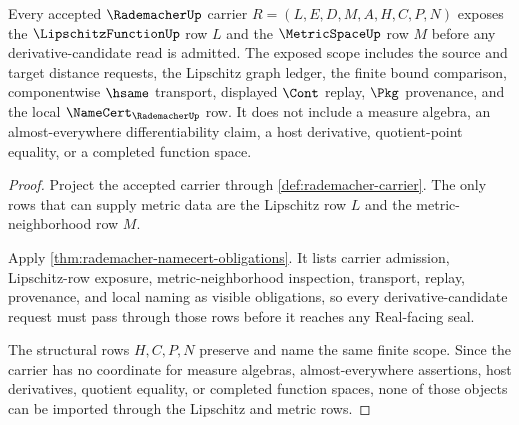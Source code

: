 \begin{theorem}
\label{thm:rademacher-lipschitz-metric-scope}
Every accepted $\RademacherUp$ carrier $R=(L,E,D,M,A,H,C,P,N)$ exposes the $\LipschitzFunctionUp$ row $L$ and the $\MetricSpaceUp$ row $M$ before any derivative-candidate read is admitted. The exposed scope includes the source and target distance requests, the Lipschitz graph ledger, the finite bound comparison, componentwise $\hsame$ transport, displayed $\Cont$ replay, $\Pkg$ provenance, and the local $\NameCert_{\RademacherUp}$ row. It does not include a measure algebra, an almost-everywhere differentiability claim, a host derivative, quotient-point equality, or a completed function space.
\end{theorem}
\begin{proof}
Project the accepted carrier through \autoref{def:rademacher-carrier}. The only rows that can supply metric data are the Lipschitz row $L$ and the metric-neighborhood row $M$.

Apply \autoref{thm:rademacher-namecert-obligations}. It lists carrier admission, Lipschitz-row exposure, metric-neighborhood inspection, transport, replay, provenance, and local naming as visible obligations, so every derivative-candidate request must pass through those rows before it reaches any Real-facing seal.

The structural rows $H,C,P,N$ preserve and name the same finite scope. Since the carrier has no coordinate for measure algebras, almost-everywhere assertions, host derivatives, quotient equality, or completed function spaces, none of those objects can be imported through the Lipschitz and metric rows.
\end{proof}

